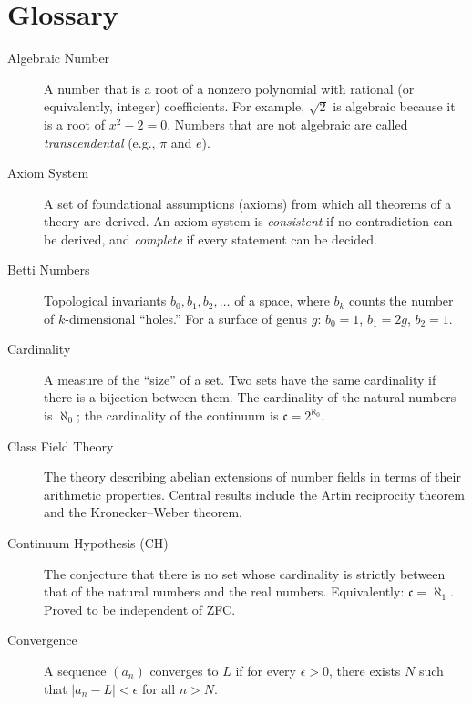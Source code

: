 
\chapter*{Glossary}

\begin{description}
    \item[Algebraic Number] A number that is a root of a nonzero polynomial with rational (or equivalently, integer) coefficients. For example, $\sqrt{2}$ is algebraic because it is a root of $x^2 - 2 = 0$. Numbers that are not algebraic are called \textit{transcendental} (e.g., $\pi$ and $e$).

    \item[Axiom System] A set of foundational assumptions (axioms) from which all theorems of a theory are derived. An axiom system is \textit{consistent} if no contradiction can be derived, and \textit{complete} if every statement can be decided.

    \item[Betti Numbers] Topological invariants $b_0, b_1, b_2, \ldots$ of a space, where $b_k$ counts the number of $k$-dimensional ``holes.'' For a surface of genus $g$: $b_0 = 1$, $b_1 = 2g$, $b_2 = 1$.

    \item[Cardinality] A measure of the ``size'' of a set. Two sets have the same cardinality if there is a bijection between them. The cardinality of the natural numbers is $\aleph_0$; the cardinality of the continuum is $\mathfrak{c} = 2^{\aleph_0}$.

    \item[Class Field Theory] The theory describing abelian extensions of number fields in terms of their arithmetic properties. Central results include the Artin reciprocity theorem and the Kronecker--Weber theorem.

    \item[Continuum Hypothesis (CH)] The conjecture that there is no set whose cardinality is strictly between that of the natural numbers and the real numbers. Equivalently: $\mathfrak{c} = \aleph_1$. Proved to be independent of ZFC.

    \item[Convergence] A sequence $(a_n)$ converges to $L$ if for every $\epsilon > 0$, there exists $N$ such that $|a_n - L| < \epsilon$ for all $n > N$.


\end{description}
